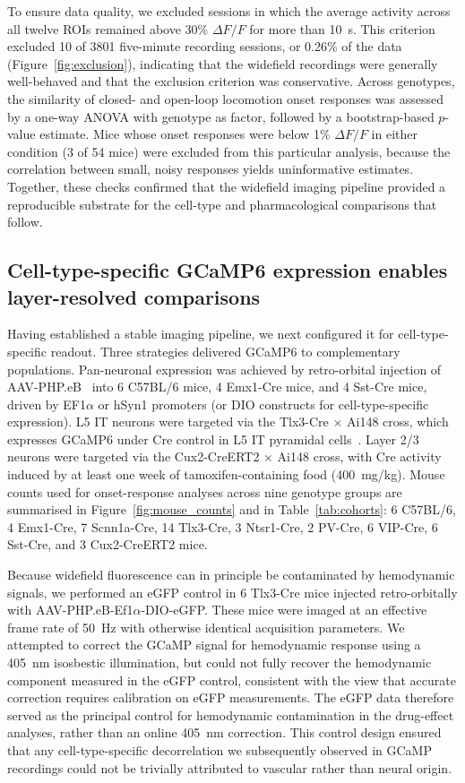 \documentclass[11pt]{article}
\begin{document}
To ensure data quality, we excluded sessions in which the average activity across all twelve ROIs remained above 30\% $\Delta F / F$ for more than 10~s. This criterion excluded 10 of 3801 five-minute recording sessions, or 0.26\% of the data (Figure~\ref{fig:exclusion}), indicating that the widefield recordings were generally well-behaved and that the exclusion criterion was conservative. Across genotypes, the similarity of closed- and open-loop locomotion onset responses was assessed by a one-way ANOVA with genotype as factor, followed by a bootstrap-based $p$-value estimate. Mice whose onset responses were below 1\% $\Delta F / F$ in either condition (3 of 54 mice) were excluded from this particular analysis, because the correlation between small, noisy responses yields uninformative estimates. Together, these checks confirmed that the widefield imaging pipeline provided a reproducible substrate for the cell-type and pharmacological comparisons that follow.

\subsection{Cell-type-specific GCaMP6 expression enables layer-resolved comparisons}

Having established a stable imaging pipeline, we next configured it for cell-type-specific readout. Three strategies delivered GCaMP6 to complementary populations. Pan-neuronal expression was achieved by retro-orbital injection of AAV-PHP.eB~\citep{chan2017engineered} into 6 C57BL/6 mice, 4 Emx1-Cre mice, and 4 Sst-Cre mice, driven by EF1$\alpha$ or hSyn1 promoters (or DIO constructs for cell-type-specific expression). L5 IT neurons were targeted via the Tlx3-Cre $\times$ Ai148 cross, which expresses GCaMP6 under Cre control in L5 IT pyramidal cells~\citep{daigle2018suite, liu2024celltype}. Layer 2/3 neurons were targeted via the Cux2-CreERT2 $\times$ Ai148 cross, with Cre activity induced by at least one week of tamoxifen-containing food (400~mg/kg). Mouse counts used for onset-response analyses across nine genotype groups are summarised in Figure~\ref{fig:mouse_counts} and in Table~\ref{tab:cohorts}: 6 C57BL/6, 4 Emx1-Cre, 7 Scnn1a-Cre, 14 Tlx3-Cre, 3 Ntsr1-Cre, 2 PV-Cre, 6 VIP-Cre, 6 Sst-Cre, and 3 Cux2-CreERT2 mice.

Because widefield fluorescence can in principle be contaminated by hemodynamic signals, we performed an eGFP control in 6 Tlx3-Cre mice injected retro-orbitally with AAV-PHP.eB-Ef1$\alpha$-DIO-eGFP. These mice were imaged at an effective frame rate of 50~Hz with otherwise identical acquisition parameters. We attempted to correct the GCaMP signal for hemodynamic response using a 405~nm isosbestic illumination, but could not fully recover the hemodynamic component measured in the eGFP control, consistent with the view that accurate correction requires calibration on eGFP measurements. The eGFP data therefore served as the principal control for hemodynamic contamination in the drug-effect analyses, rather than an online 405~nm correction. This control design ensured that any cell-type-specific decorrelation we subsequently observed in GCaMP recordings could not be trivially attributed to vascular rather than neural origin.
\end{document}

